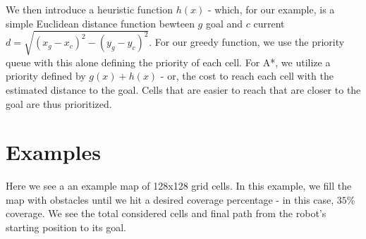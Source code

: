 \documentclass{article}
\begin{document}
We then introduce a heuristic function $h(x)$ - which, for our example, is a simple Euclidean distance function bewteen $g$ goal and $c$ current $d = \sqrt{(x_g - x_c)^2 - (y_g - y_c)^2}$. For our greedy function, we use the priority queue with this alone defining the priority of each cell. For A*, we utilize a priority defined by $g(x) + h(x)$ - or, the cost to reach each cell with the estimated distance to the goal. Cells that are easier to reach that are closer to the goal are thus prioritized.

\section*{Examples}
Here we see a an example map of 128x128 grid cells. In this example, we fill the map with obstacles until we hit a desired coverage percentage - in this case, $ 35\% $ coverage. We see the total considered cells and final path from the robot's starting position to its goal.
\end{document}
